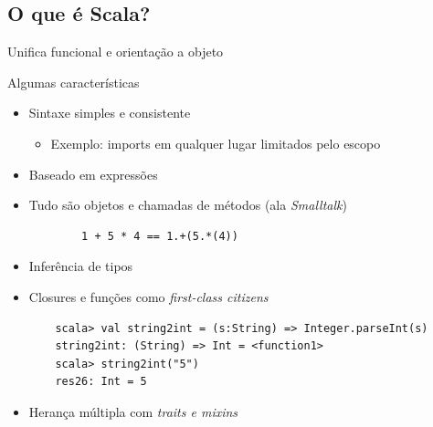 \documentclass{beamer}
\begin{document}
\subsection{O que é Scala?}

\begin{frame}{Unifica funcional e orientação a objeto} 
\end{frame}

\begin{frame}[fragile]{Algumas características} 
    \begin{itemize} %
        \item Sintaxe simples e consistente 
        \begin{itemize}
              \item Exemplo: imports em qualquer lugar limitados pelo escopo 
        \end{itemize}
        \item Baseado em expressões
        \item Tudo são objetos e chamadas de métodos (ala \emph{Smalltalk})
	\begin{lstlisting}
		1 + 5 * 4 == 1.+(5.*(4))
	 \end{lstlisting}
        \item Inferência de tipos
        \item Closures e funções como \emph{first-class citizens}
	\begin{lstlisting}
	scala> val string2int = (s:String) => Integer.parseInt(s)	
	string2int: (String) => Int = <function1>
	scala> string2int("5")
	res26: Int = 5
	\end{lstlisting}
         \item Herança múltipla com \emph{traits e mixins}
    \end{itemize}
\end{frame}
\end{document}
